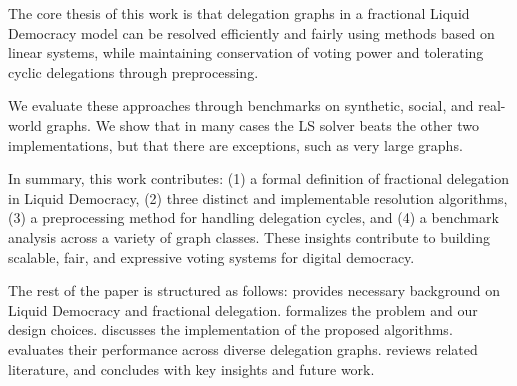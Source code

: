 The core thesis of this work is that delegation graphs in a fractional Liquid Democracy model can be resolved efficiently and fairly using methods based on linear systems, while maintaining conservation of voting power and tolerating cyclic delegations through preprocessing.

We evaluate these approaches through benchmarks on synthetic, social, and real-world graphs. We show that in many cases the LS solver beats the other two implementations, but that there are exceptions, such as very large graphs.

In summary, this work contributes: (1) a formal definition of fractional delegation in Liquid Democracy, (2) three distinct and implementable resolution algorithms, (3) a preprocessing method for handling delegation cycles, and (4) a benchmark analysis across a variety of graph classes. These insights contribute to building scalable, fair, and expressive voting systems for digital democracy.

The rest of the paper is structured as follows:  provides necessary background on Liquid Democracy and fractional delegation.  formalizes the problem and our design choices.  discusses the implementation of the proposed algorithms.  evaluates their performance across diverse delegation graphs.  reviews related literature, and  concludes with key insights and future work.